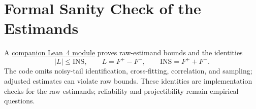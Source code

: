 \documentclass[12pt]{article}
\newcommand{\ins}{\mathrm{INS}}
\begin{document}
\appendix

\section{Formal Sanity Check of the Estimands}\label{app:formal_metrics}

A \href{https://github.com/BrettRey/agi-evaluation-hpc/tree/master/formalization}{companion Lean~4 module} proves raw-estimand bounds and the identities
\[
|L|\leq\ins,\qquad
L=F^+-F^-,\qquad
\ins=F^++F^-.
\]
The code omits noisy-tail identification, cross-fitting, correlation, and sampling; adjusted estimates can violate raw bounds. These identities are implementation checks for the raw estimands; reliability and projectibility remain empirical questions.

\thispagestyle{appendixmixed}
\printbibliography
\end{document}
